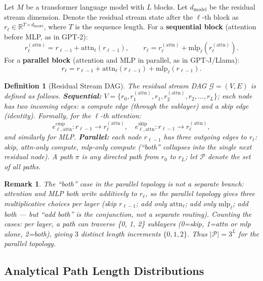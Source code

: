 \documentclass{article}
\newtheorem{definition}{Definition}
\newtheorem{remark}{Remark}
\newcommand{\R}{\mathbb{R}}
\newcommand{\Gcal}{\mathcal{G}}
\newcommand{\Pcal}{\mathcal{P}}
\newcommand{\dmodel}{d_{\mathrm{model}}}
\newcommand{\attn}{\mathrm{attn}}
\newcommand{\mlp}{\mathrm{mlp}}
\begin{document}
Let $M$ be a transformer language model with $L$ blocks.
Let $\dmodel$ be the residual stream dimension.
Denote the residual stream state after the $\ell$-th block as $r_\ell \in \R^{T \times \dmodel}$,
where $T$ is the sequence length.
For a \textbf{sequential block} (attention before MLP, as in GPT-2):
\begin{equation}
  r_\ell^{(\attn)} = r_{\ell-1} + \attn_\ell(r_{\ell-1}),
  \qquad
  r_\ell = r_\ell^{(\attn)} + \mlp_\ell(r_\ell^{(\attn)}).
  \label{eq:sequential}
\end{equation}
For a \textbf{parallel block} (attention and MLP in parallel, as in GPT-J/Llama):
\begin{equation}
  r_\ell = r_{\ell-1} + \attn_\ell(r_{\ell-1}) + \mlp_\ell(r_{\ell-1}).
  \label{eq:parallel}
\end{equation}

\begin{definition}[Residual Stream DAG]
\label{def:dag}
The \emph{residual stream DAG} $\Gcal = (V, E)$ is defined as follows.
\textbf{Sequential:} $V = \{r_0, r_1^{(\attn)}, r_1, r_2^{(\attn)}, r_2, \ldots, r_L\}$;
each node has two incoming edges: a \emph{compute} edge (through the sublayer) and a
\emph{skip} edge (identity).  Formally, for the $\ell$-th attention:
\[
  e^{\mathrm{cmp}}_{\ell,\attn}: r_{\ell-1} \to r_\ell^{(\attn)}, \quad
  e^{\mathrm{skip}}_{\ell,\attn}: r_{\ell-1} \to r_\ell^{(\attn)},
\]
and similarly for MLP.  \textbf{Parallel:} each node $r_{\ell-1}$ has three outgoing
edges to $r_\ell$: skip, attn-only compute, mlp-only compute (``both'' collapses
into the single next residual node).
A \emph{path} $\pi$ is any directed path from $r_0$ to $r_L$; let $\Pcal$ denote the set of all paths.
\end{definition}

\begin{remark}
The ``both'' case in the parallel topology is not a separate branch: attention and MLP
both write additively to $r_\ell$, so the parallel topology gives three \emph{multiplicative}
choices per layer (skip $r_{\ell-1}$; add only $\attn_\ell$; add only $\mlp_\ell$;
add both — but ``add both'' is the conjunction, not a separate routing).
Counting the cases: per layer, a path can traverse \{0, 1, 2\} sublayers (0=skip,
1=attn or mlp alone, 2=both), giving $3$ distinct length increments $\{0, 1, 2\}$.
Thus $|\Pcal| = 3^L$ for the parallel topology.
\end{remark}

\subsection{Analytical Path Length Distributions}
\label{sec:analytical}
\end{document}
